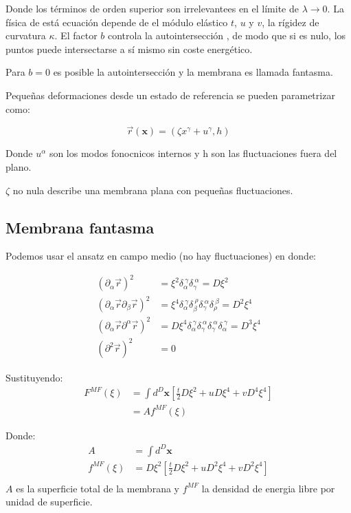 Donde los términos de orden superior son irrelevantees en el límite de
$\lambda\rightarrow 0$. La física de está ecuación depende de el módulo
elástico $t$, $u$ y $v$, la rígidez de curvatura $\kappa$. El factor $b$
controla la autointersección , de modo que si es nulo, los puntos puede
intersectarse a sí mismo sin coste energético.

Para $b=0$ es posible la autointersección y la membrana es llamada fantasma.

Pequeñas deformaciones desde un estado de referencia se pueden parametrizar
como:

\begin{equation}
\vec{r}(\mathbf{x})=(\zeta x^{\gamma}+u^{\gamma},h)
\end{equation}

Donde $u^{\alpha}$ son los modos fonocnicos internos y h son las fluctuaciones
fuera del plano.

$\zeta$ no nula describe una membrana plana con pequeñas fluctuaciones.

\subsection{Membrana fantasma}

Podemos usar el ansatz en campo medio (no hay fluctuaciones) en donde:

\begin{align}
(\partial_{\alpha} \vec{r})^2&= \xi^2 \delta_{\alpha}^{\
  \gamma}\delta_{\gamma}^{\ \alpha}=D\xi^2 \\
(\partial_{\alpha} \vec{r}\partial_{\beta} \vec{r} )^2&=\xi^4 \delta_{\alpha}^{\
  \gamma}\delta_{\beta}^{\ \rho}\delta_{\gamma}^{\ \alpha}\delta_{\rho}^{\
  \beta}=D^2\xi^4\\
(\partial_{\alpha} \vec{r}\partial^{\alpha} \vec{r} )^2&=D\xi^4 \delta_{\alpha}^{\
  \gamma}\delta^{\ \alpha}_{\gamma}\delta_{\gamma}^{\
  \alpha}\delta_{\alpha}^{\ \gamma}=D^3\xi^4\\
(\partial^2 \vec{r})^2&=0
\end{align}

Sustituyendo:
\begin{align}
F^{MF}(\xi)&=\int d^D \mathbf{x} \left[ \frac{t}{2} D\xi^2 + u D\xi^4+vD^4\xi^4\right]\\
          &=Af^{MF}(\xi)
\end{align}

Donde:
\begin{align}
A&=\int d^D\mathbf{x}\\
f^{MF}(\xi)&=D\xi^2\left[ \frac{t}{2} D\xi^2 + u D^2\xi^4 + v D^2\xi^4\right] \\
\end{align}
 $A$ es la superficie total de la membrana y $f^{MF}$ la densidad de energia
 libre por unidad de superficie.


